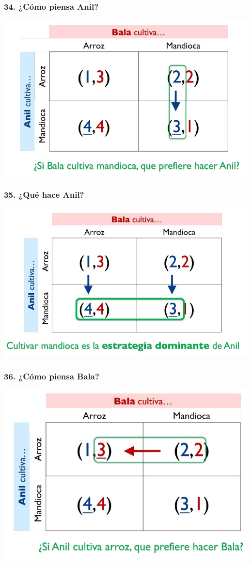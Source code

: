 \documentclass[14pt]{beamer}
\begin{document}
\begin{frame}
\frametitle{34. ¿Cómo piensa Anil?}
\centering
\includegraphics[scale=0.6]{Figures/Tema_03_14_bala.jpg}
\end{frame}

\begin{frame}
\frametitle{35. ¿Qué hace Anil?}
\centering
\includegraphics[scale=0.6]{Figures/Tema_03_15_bala.jpg}
\end{frame}

\begin{frame}
\frametitle{36. ¿Cómo piensa Bala?}
\centering
\includegraphics[scale=0.6]{Figures/Tema_03_16_bala.jpg}
\end{frame}
\end{document}
